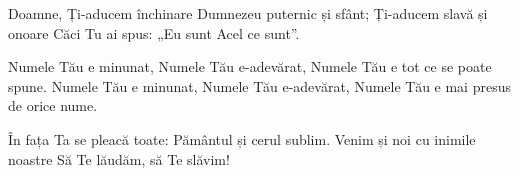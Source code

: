 
\beginverse
Doamne, Ți-aducem închinare
Dumnezeu puternic și sfânt;
Ți-aducem slavă și onoare
Căci Tu ai spus: „Eu sunt Acel ce sunt”.
\endverse

\beginchorus
Numele Tău e minunat,
Numele Tău e-adevărat,
Numele Tău e tot ce se poate spune.
Numele Tău e minunat,
Numele Tău e-adevărat,
Numele Tău e mai presus de orice nume.
\endchorus

\beginverse
În fața Ta se pleacă toate:
Pământul și cerul sublim.
Venim și noi cu inimile noastre
Să Te lăudăm, să Te slăvim!
\endverse

\endsong